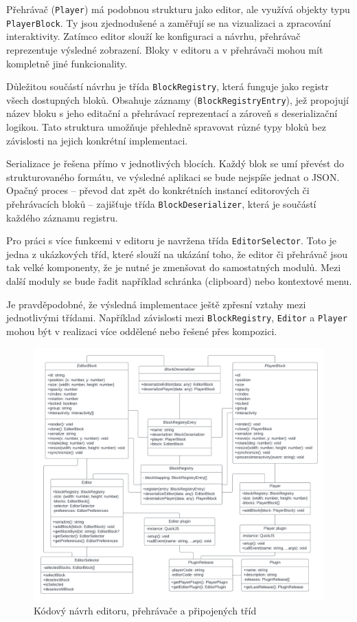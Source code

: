 Přehrávač (\texttt{Player}) má podobnou strukturu jako editor, ale využívá objekty typu \texttt{PlayerBlock}. 
Ty jsou zjednodušené a zaměřují se na vizualizaci a zpracování interaktivity. 
Zatímco editor slouží ke konfiguraci a návrhu, přehrávač reprezentuje výsledné zobrazení.
Bloky v editoru a v přehrávači mohou mít kompletně jiné funkcionality.

Důležitou součástí návrhu je třída \texttt{BlockRegistry}, která funguje jako registr všech dostupných bloků. 
Obsahuje záznamy (\texttt{BlockRegistryEntry}), jež propojují název bloku s jeho editační a přehrávací reprezentací a zároveň s deserializační logikou. 
Tato struktura umožňuje přehledně spravovat různé typy bloků bez závislosti na jejich konkrétní implementaci.

Serializace je řešena přímo v jednotlivých blocích.
Každý blok se umí převést do strukturovaného formátu, ve výsledné aplikaci se bude nejspíše jednat o JSON.
Opačný proces -- převod dat zpět do konkrétních instancí editorových či přehrávacích bloků -- zajišťuje třída \texttt{BlockDeserializer}, která je součástí každého záznamu registru.

Pro práci s více funkcemi v editoru je navržena třída \texttt{EditorSelector}. 
Toto je jedna z ukázkových tříd, které slouží na ukázání toho, že editor či přehrávač jsou tak velké komponenty, že je nutné je zmenšovat do samostatných modulů.
Mezi další moduly se bude řadit například schránka (clipboard) nebo kontextové menu. 

Je pravděpodobné, že výsledná implementace ještě zpřesní vztahy mezi jednotlivými třídami.
Například závislosti mezi \texttt{BlockRegistry}, \texttt{Editor} a \texttt{Player} mohou být v realizaci více oddělené nebo řešené přes kompozici.

\begin{figure}[ht!]
    \centering
    \includegraphics[width=1\textwidth]{media/04_navrh/kodovyNavrh.pdf}
    \caption{Kódový návrh editoru, přehrávače a připojených tříd}
    \label{fig:kodovyNavrhEditoruAPrehravace}
\end{figure}


